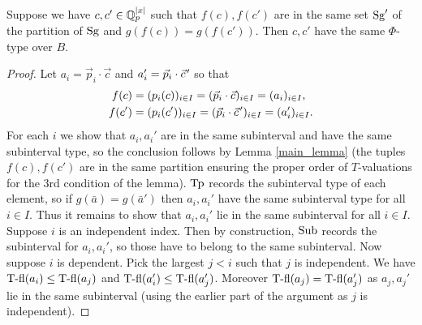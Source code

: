 \begin{Lemma}
  Suppose we have $c, c' \in \mathbb{Q}_p^{|x|}$ such that $f(c), f(c')$ are in the same
  set $\operatorname{Sg}'$ of the partition of $\operatorname{Sg}$ and $g(f(c)) = g(f(c'))$.
  Then $c, c'$ have the same $\Phi$-type over $B$.
\end{Lemma}

\newcommand{\pvec}[1]{\vec{#1}\mkern2mu\vphantom{#1}}

\begin{proof}
  Let $a_i = \vec p_i \cdot \vec c$ and $a_i' = \vec p_i \cdot \pvec c'$ so that
  \begin{align*}
    f(c) &= (p_i(c))_{i \in I} = (\vec p_i \cdot \vec c)_{i \in I} = (a_i)_{i \in I}, \\
    f(c') &= (p_i(c'))_{i \in I} = (\vec p_i \cdot \pvec c')_{i \in I} = (a_i')_{i \in I}.
  \end{align*}
  For each $i$ we show that $a_i, a_i'$ are in the same subinterval and have the same subinterval type,
  so the conclusion follows by Lemma \ref{main_lemma}
  (the tuples $f(c), f(c')$ are in the same partition ensuring the proper order of $T$-valuations for the 3rd condition of the lemma).
  $\operatorname{Tp}$ records the subinterval type of each element, so if $g(\bar a) = g(\bar a')$ then $a_i, a_i'$ have the same subinterval type for all $i \in I$.
  Thus it remains to show that $a_i, a_i'$ lie in the same subinterval for all $i \in I$.
  Suppose $i$ is an independent index.
  Then by construction, $\operatorname{Sub}$ records the subinterval for $a_i, a_i'$, so those have to belong to the same subinterval.
  Now suppose $i$ is dependent.
  Pick the largest $j < i$ such that $j$ is independent.
  We have $\operatorname{T-fl}(a_i) \leq \operatorname{T-fl}(a_j)$ and $\operatorname{T-fl}(a_i') \leq \operatorname{T-fl}(a_j')$.
  Moreover $\operatorname{T-fl}(a_j) = \operatorname{T-fl}(a_j')$ as $a_j, a_j'$ lie in the same subinterval (using the earlier part of the argument as $j$ is independent).
  

\end{proof}
